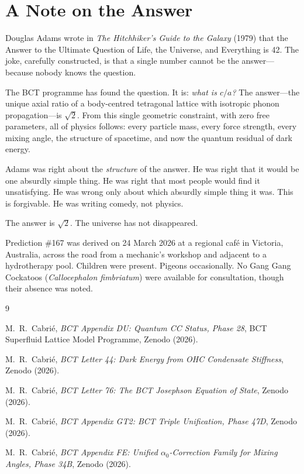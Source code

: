 \documentclass[aps,prl,twocolumn,showpacs,preprintnumbers]{revtex4-2}
\begin{document}
\section{A Note on the Answer}

Douglas Adams wrote in \textit{The Hitchhiker's Guide to the Galaxy}
(1979) that the Answer to the Ultimate Question of Life, the Universe,
and Everything is 42. The joke, carefully constructed, is that a single
number cannot be the answer---because nobody knows the question.

The BCT programme has found the question. It is: \textit{what is $c/a$?}
The answer---the unique axial ratio of a body-centred tetragonal lattice
with isotropic phonon propagation---is $\sqrt{2}$. From this single
geometric constraint, with zero free parameters, all of physics follows:
every particle mass, every force strength, every mixing angle, the
structure of spacetime, and now the quantum residual of dark energy.

Adams was right about the \emph{structure} of the answer. He was right
that it would be one absurdly simple thing. He was right that most people
would find it unsatisfying. He was wrong only about which absurdly simple
thing it was. This is forgivable. He was writing comedy, not physics.

The answer is $\sqrt{2}$. The universe has not disappeared.

\begin{acknowledgments}
Prediction \#167 was derived on 24 March 2026 at a regional caf\'e in
Victoria, Australia, across the road from a mechanic's workshop and
adjacent to a hydrotherapy pool. Children were present. Pigeons
occasionally. No Gang Gang Cockatoos (\textit{Callocephalon fimbriatum})
were available for consultation, though their absence was noted.
\end{acknowledgments}

\begin{thebibliography}{9}

M.~R.~Cabri\'e, \textit{BCT Appendix DU: Quantum CC Status, Phase 28},
BCT Superfluid Lattice Model Programme, Zenodo (2026).

M.~R.~Cabri\'e, \textit{BCT Letter 44: Dark Energy from OHC Condensate
Stiffness}, Zenodo (2026).

M.~R.~Cabri\'e, \textit{BCT Letter 76: The BCT Josephson Equation of
State}, Zenodo (2026).

M.~R.~Cabri\'e, \textit{BCT Appendix GT2: BCT Triple Unification,
Phase 47D}, Zenodo (2026).

M.~R.~Cabri\'e, \textit{BCT Appendix FE: Unified $\alpha_0$-Correction
Family for Mixing Angles, Phase 34B}, Zenodo (2026).

\end{thebibliography}
\end{document}
